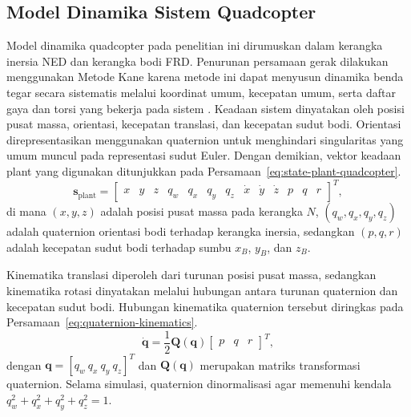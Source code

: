 \documentclass[12pt,a4paper]{report}
\begin{document}
\subsection{Model Dinamika Sistem Quadcopter}
Model dinamika quadcopter pada penelitian ini dirumuskan dalam kerangka inersia NED dan kerangka bodi FRD. Penurunan persamaan gerak dilakukan menggunakan Metode Kane karena metode ini dapat menyusun dinamika benda tegar secara sistematis melalui koordinat umum, kecepatan umum, serta daftar gaya dan torsi yang bekerja pada sistem \cite{kaneDynamicsTheoryApplications1985}. Keadaan sistem dinyatakan oleh posisi pusat massa, orientasi, kecepatan translasi, dan kecepatan sudut bodi. Orientasi direpresentasikan menggunakan quaternion untuk menghindari singularitas yang umum muncul pada representasi sudut Euler. Dengan demikian, vektor keadaan plant yang digunakan ditunjukkan pada Persamaan~\ref{eq:state-plant-quadcopter}.
\begin{equation}
    \mathbf{s}_{\mathrm{plant}} =
    \begin{bmatrix}
        x & y & z & q_w & q_x & q_y & q_z & \dot{x} & \dot{y} & \dot{z} & p & q & r
    \end{bmatrix}^{T},
    \label{eq:state-plant-quadcopter}
\end{equation}
di mana $(x,y,z)$ adalah posisi pusat massa pada kerangka $N$, $(q_w,q_x,q_y,q_z)$ adalah quaternion orientasi bodi terhadap kerangka inersia, sedangkan $(p,q,r)$ adalah kecepatan sudut bodi terhadap sumbu $x_B$, $y_B$, dan $z_B$.

Kinematika translasi diperoleh dari turunan posisi pusat massa, sedangkan kinematika rotasi dinyatakan melalui hubungan antara turunan quaternion dan kecepatan sudut bodi. Hubungan kinematika quaternion tersebut diringkas pada Persamaan~\ref{eq:quaternion-kinematics}.
\begin{equation}
    \dot{\mathbf{q}} = \frac{1}{2}\mathbf{Q}(\mathbf{q})
    \begin{bmatrix}
        p & q & r
    \end{bmatrix}^{T},
    \label{eq:quaternion-kinematics}
\end{equation}
dengan $\mathbf{q}=[q_w\ q_x\ q_y\ q_z]^T$ dan $\mathbf{Q}(\mathbf{q})$ merupakan matriks transformasi quaternion. Selama simulasi, quaternion dinormalisasi agar memenuhi kendala $q_w^2+q_x^2+q_y^2+q_z^2=1$.
\end{document}
